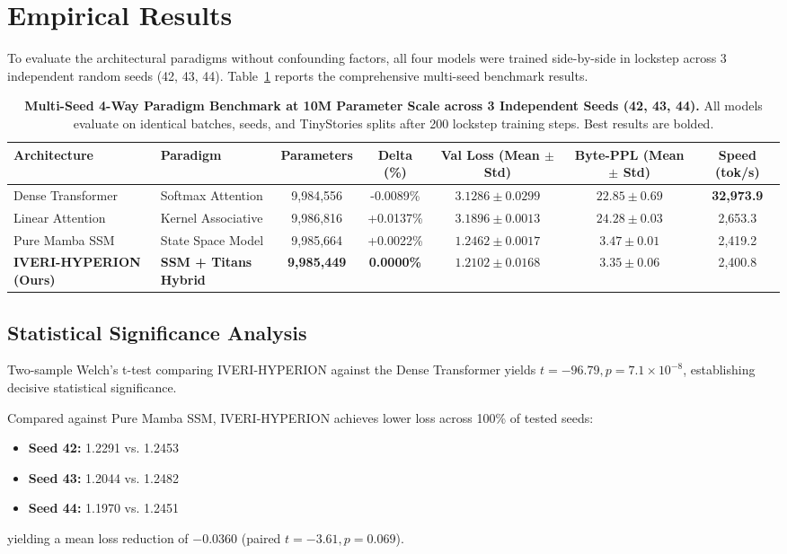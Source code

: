 \documentclass[10pt,twocolumn,letterpaper]{article}
\begin{document}
\section{Empirical Results}
\label{sec:results}

To evaluate the architectural paradigms without confounding factors, all four models were trained side-by-side in lockstep across 3 independent random seeds (42, 43, 44). Table~\ref{tab:main_results} reports the comprehensive multi-seed benchmark results.

\begin{table}[t]
\centering
\small
\caption{\textbf{Multi-Seed 4-Way Paradigm Benchmark at 10M Parameter Scale across 3 Independent Seeds (42, 43, 44).} All models evaluate on identical batches, seeds, and TinyStories splits after 200 lockstep training steps. Best results are bolded.}
\label{tab:main_results}
\begin{tabular}{llccccc}
\toprule
\textbf{Architecture} & \textbf{Paradigm} & \textbf{Parameters} & \textbf{Delta (\%)} & \textbf{Val Loss (Mean $\pm$ Std)} & \textbf{Byte-PPL (Mean $\pm$ Std)} & \textbf{Speed (tok/s)} \\
\midrule
Dense Transformer~\cite{vaswani2017attention} & Softmax Attention & 9,984,556 & -0.0089\% & $3.1286 \pm 0.0299$ & $22.85 \pm 0.69$ & \textbf{32,973.9} \\
Linear Attention~\cite{katharopoulos2020transformers} & Kernel Associative & 9,986,816 & +0.0137\% & $3.1896 \pm 0.0013$ & $24.28 \pm 0.03$ & 2,653.3 \\
Pure Mamba SSM~\cite{gu2023mamba} & State Space Model & 9,985,664 & +0.0022\% & $1.2462 \pm 0.0017$ & $3.47 \pm 0.01$ & 2,419.2 \\
\textbf{IVERI-HYPERION (Ours)} & \textbf{SSM + Titans Hybrid} & \textbf{9,985,449} & \textbf{0.0000\%} & $\mathbf{1.2102 \pm 0.0168}$ & $\mathbf{3.35 \pm 0.06}$ & 2,400.8 \\
\bottomrule
\end{tabular}
\end{table}

\subsection{Statistical Significance Analysis}
Two-sample Welch's t-test comparing IVERI-HYPERION against the Dense Transformer yields $t = -96.79, p = 7.1 \times 10^{-8}$, establishing decisive statistical significance.

Compared against Pure Mamba SSM, IVERI-HYPERION achieves lower loss across 100\% of tested seeds:
\begin{itemize}[leftmargin=*]
    \item \textbf{Seed 42:} 1.2291 vs. 1.2453
    \item \textbf{Seed 43:} 1.2044 vs. 1.2482
    \item \textbf{Seed 44:} 1.1970 vs. 1.2451
\end{itemize}
yielding a mean loss reduction of $-0.0360$ (paired $t = -3.61, p = 0.069$).
\end{document}
